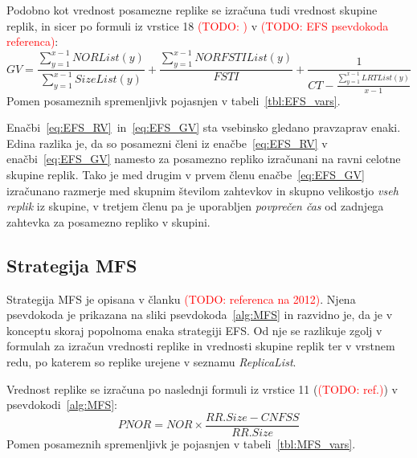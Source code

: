 \documentclass[a4paper, 12pt]{book}
\newcommand{\TODO}[1]{\textcolor{red}{(TODO: #1)}}
\begin{document}
\begin{samepage}
Podobno kot vrednost posamezne replike se izračuna tudi vrednost skupine
replik, in sicer po formuli iz vrstice 18 \TODO{} v
\TODO{EFS psevdokoda referenca}:
\begin{equation}
  \mathit{GV} = \frac{\sum\limits_{y=1}^{x-1} \mathit{NORList(y)}}{
                      \sum\limits_{y=1}^{x-1} \mathit{SizeList(y)}} +
                \frac{\sum\limits_{y=1}^{x-1} \mathit{NORFSTIList(y)}}{
                      \mathit{FSTI}} +
                \frac{1}{\mathit{CT} - \frac{\sum\limits_{y=1}^{x-1}
                         \mathit{LRTList(y)}}{x-1}}
  \label{eq:EFS_GV}
\end{equation}
Pomen posameznih spremenljivk pojasnjen v tabeli~\ref{tbl:EFS_vars}.
\end{samepage}
\vspace{0.5em}

Enačbi~\eqref{eq:EFS_RV}~in~\eqref{eq:EFS_GV} sta vsebinsko gledano
pravzaprav enaki. Edina razlika je, da so posamezni členi iz
enačbe~\eqref{eq:EFS_RV} v enačbi~\eqref{eq:EFS_GV} namesto za posamezno
repliko izračunani na ravni celotne skupine replik.
Tako je med drugim v prvem členu enačbe~\eqref{eq:EFS_GV} izračunano razmerje
med skupnim številom zahtevkov in skupno velikostjo \textit{vseh replik} iz
skupine, v tretjem členu pa je uporabljen \textit{povprečen čas} od zadnjega
zahtevka za posamezno repliko v skupini.


\subsection{Strategija MFS}

Strategija MFS je opisana v članku \TODO{referenca na 2012}. Njena
psevdokoda je prikazana na sliki psevdokoda~\ref{alg:MFS} in razvidno je,
da je v konceptu skoraj popolnoma enaka strategiji EFS. Od nje se razlikuje
zgolj v formulah za izračun vrednosti replike in vrednosti skupine replik
ter v vrstnem redu, po katerem so replike urejene v seznamu
\textit{ReplicaList}.

\begin{samepage}
Vrednost replike se izračuna po naslednji formuli iz vrstice 11
(\TODO{ref.}) v psevdokodi~\ref{alg:MFS}:
\begin{equation}
  \mathit{PNOR} = \mathit{NOR} \times
                  \frac{\mathit{RR.Size} - \mathit{CNFSS}}{
                        \mathit{ RR.Size}}
  \label{eq:MFS_RV}
\end{equation}
Pomen posameznih spremenljivk je pojasnjen v tabeli~\ref{tbl:MFS_vars}.
\end{samepage}
\vspace{1em}
\end{document}

